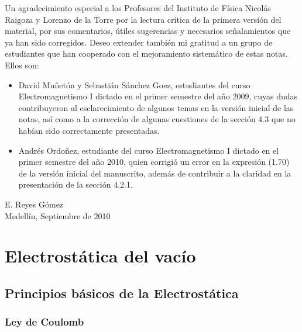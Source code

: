 \documentclass[12pt,a4paper]{book}
\begin{document}
Un agradecimiento especial a los Profesores del Instituto de Física Nicolás Raigoza y Lorenzo de la Torre por la lectura crítica de la primera versión del material, por sus comentarios, útiles sugerencias y necesarios señalamientos que ya han sido corregidos. Deseo extender también mi gratitud a un grupo de estudiantes que han cooperado con el mejoramiento sistemático de estas notas. Ellos son:

\begin{itemize}
\item David Muñetón y Sebastián Sánchez Goez, estudiantes del curso Electromagnetismo I dictado en el primer semestre del año 2009, cuyas dudas contribuyeron al esclarecimiento de algunos temas en la versión inicial de las notas, así como a la corrección de algunas cuestiones de la sección 4.3 que no habían sido correctamente presentadas.

\item Andrés Ordoñez, estudiante del curso Electromagnetismo I dictado en el primer semestre del año 2010, quien corrigió un error en la expresión (1.70) de la versión inicial del manuscrito, además de contribuir a la claridad en la presentación de la sección 4.2.1.
\end{itemize}

\begin{flushright}
E. Reyes Gómez\\
Medellín, Septiembre de 2010
\end{flushright}

\tableofcontents

\chapter{Electrostática del vacío}
\section{Principios básicos de la Electrostática}
\subsection{Ley de Coulomb}
\end{document}
